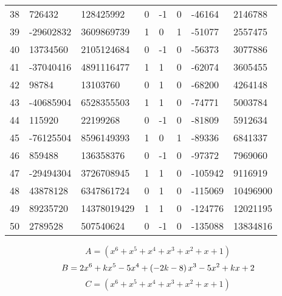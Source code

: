 \documentclass{amsart}
\begin{document}
\begin{longtable}{|l|l|l|lllll|}
38&726432&128425992&0&-1&0&-46164&2146788\\
39&-29602832&3609869739&1&0&1&-51077&2557475\\
40&13734560&2105124684&0&-1&0&-56373&3077886\\
41&-37040416&4891116477&1&1&0&-62074&3605455\\
42&98784&13103760&0&1&0&-68200&4264148\\
43&-40685904&6528355503&1&1&0&-74771&5003784\\
44&115920&22199268&0&-1&0&-81809&5912634\\
45&-76125504&8596149393&1&0&1&-89336&6841337\\
46&859488&136358376&0&-1&0&-97372&7969060\\
47&-29494304&3726708945&1&1&0&-105942&9116919\\
48&43878128&6347861724&0&1&0&-115069&10496900\\
49&89235720&14378019429&1&1&0&-124776&12021195\\
50&2789528&507540624&0&-1&0&-135088&13834816\\
\hline
\end{longtable}
$$A=(x^6
 + x^5
 + x^4
 + x^3
 + x^2
 + x
 + 1)$$
$$B=2\*x^6
 + k\*x^5
 - 5\*x^4
 + \left(-2\*k
 - 8\right) \*x^3
 - 5\*x^2
 + k\*x
 + 2$$
$$C=(x^6
 + x^5
 + x^4
 + x^3
 + x^2
 + x
 + 1)$$
\end{document}
